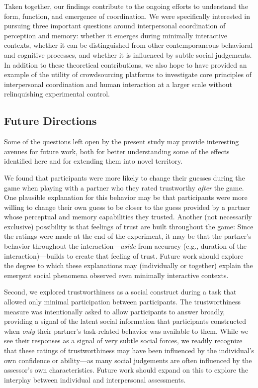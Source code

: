 \documentclass[10pt, letterpaper]{article}
\begin{document}
Taken together, our findings contribute to the ongoing efforts to
understand the form, function, and emergence of coordination. We were
specifically interested in pursuing three important questions around
interpersonal coordination of perception and memory: whether it emerges
during minimally interactive contexts, whether it can be distinguished
from other contemporaneous behavioral and cognitive processes, and
whether it is influenced by subtle social judgements. In addition to
these theoretical contributions, we also hope to have provided an
example of the utility of crowdsourcing platforms to investigate core
principles of interpersonal coordination and human interaction at a
larger scale without relinquishing experimental control.

\subsection{Future Directions}\label{future-directions}

Some of the questions left open by the present study may provide
interesting avenues for future work, both for better understanding some
of the effects identified here and for extending them into novel
territory.

We found that participants were more likely to change their guesses
during the game when playing with a partner who they rated trustworthy
\emph{after} the game. One plausible explanation for this behavior may
be that participants were more willing to change their own guess to be
closer to the guess provided by a partner whose perceptual and memory
capabilities they trusted. Another (not necessarily exclusive)
possibility is that feelings of trust are built throughout the game:
Since the ratings were made at the end of the experiment, it may be that
the partner's behavior throughout the interaction---\emph{aside} from
accuracy (e.g., duration of the interaction)---builds to create that
feeling of trust. Future work should explore the degree to which these
explanations may (individually or together) explain the emergent social
phenomena observed even minimally interactive contexts.

Second, we explored trustworthiness as a social construct during a task
that allowed only minimal participation between participants. The
trustworthiness measure was intentionally asked to allow participants to
answer broadly, providing a signal of the latent social information that
participants constructed when \emph{only} their partner's task-related
behavior was available to them. While we see their responses as a signal
of very subtle social forces, we readily recognize that these ratings of
trustworthiness may have been influenced by the individual's own
confidence or ability---as many social judgements are often influenced
by the assessor's own characteristics. Future work should expand on this
to explore the interplay between individual and interpersonal
assessments.
\end{document}
